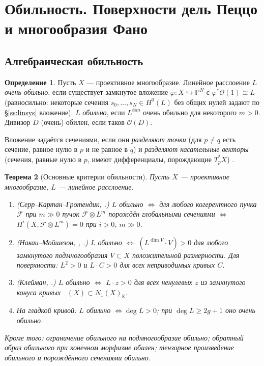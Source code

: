 \documentclass[11pt,a4paper]{article}
\theoremstyle{plain}
\newtheorem{theorem}{Теорема}[section]
\theoremstyle{definition}
\newtheorem{definition}[theorem]{Определение}
\theoremstyle{remark}
\newcommand{\R}{\mathbb{R}}
\newcommand{\PP}{\mathbb{P}}
\newcommand{\cO}{\mathcal{O}}
\newcommand{\cF}{\mathcal{F}}
\DeclareMathOperator{\NE}{\overline{NE}}
\begin{document}
\section{Обильность. Поверхности дель Пеццо и многообразия Фано}\label{sec:ample}

\subsection{Алгебраическая обильность}

\begin{definition}
Пусть $X$ --- проективное многообразие. Линейное расслоение $L$ \emph{очень обильно}, если существует
замкнутое вложение $\varphi\colon X\hookrightarrow\PP^N$ с $\varphi^*\cO(1)\cong L$ (равносильно: некоторые
сечения $s_0,\dots,s_N\in H^0(L)$ без общих нулей задают по \S\ref{ss:linsys} вложение). $L$
\emph{обильно}, если $L^{\otimes m}$ очень обильно для некоторого $m>0$. Дивизор $D$ (очень) обилен, если
таков $\cO(D)$.
\end{definition}

Вложение задаётся сечениями, если они \emph{разделяют точки} (для $p\ne q$ есть сечение, равное нулю в $p$
и не равное в $q$) и \emph{разделяют касательные векторы} (сечения, равные нулю в $p$, имеют
дифференциалы, порождающие $T_p^*X$) \cite[II.7.3]{Ha}.

\begin{theorem}[Основные критерии обильности]\label{thm:ample-criteria}
Пусть $X$ --- проективное многообразие, $L$ --- линейное расслоение.
\begin{enumerate}
\item (\emph{Серр--Картан--Гротендик}, \cite[II.7.6, III.7.5]{Ha}.) $L$ обильно $\iff$ для любого
когерентного пучка $\cF$ при $m\gg0$ пучок $\cF\otimes L^m$ порождён глобальными сечениями
$\iff$ $H^i(X,\cF\otimes L^m)=0$ при $i>0$, $m\gg0$.
\item (\emph{Накаи--Мойшезон}, \cite[V.1.10]{Ha}, \cite[1.2.23]{La}.) $L$ обильно $\iff$
$(L^{\dim V}\cdot V)>0$ для любого замкнутого подмногообразия $V\subset X$ положительной размерности.
Для поверхности: $L^2>0$ и $L\cdot C>0$ для всех неприводимых кривых $C$.
\item (\emph{Клейман}, \cite[1.4.23]{La}.) $L$ обильно $\iff$ $L\cdot z>0$ для всех ненулевых $z$ из
замкнутого конуса кривых $\NE(X)\subset N_1(X)_\R$.
\item На гладкой кривой: $L$ обильно $\iff\deg L>0$; при $\deg L\ge2g+1$ оно очень обильно.
\end{enumerate}
Кроме того: ограничение обильного на подмногообразие обильно; обратный образ обильного при конечном
морфизме обилен; тензорное произведение обильного и порождённого сечениями обильно.
\end{theorem}
\end{document}
